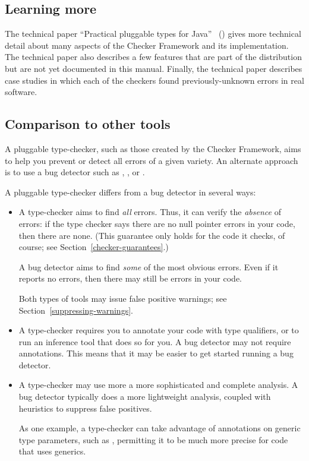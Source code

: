 \subsection{Learning more\label{learning-more}}

The technical paper ``Practical pluggable types for Java''~\cite{PapiACPE2008}
()
gives more technical detail about many
aspects of the Checker Framework and its implementation.
%
The technical paper also describes a few features that are part of the
distribution but are not yet documented in this manual.
%
Finally, the technical
paper describes case
studies in which each of the checkers found
previously-unknown errors in real software.


\subsection{Comparison to other tools\label{other-tools}}

A pluggable type-checker, such as those created by the Checker Framework,
aims to help you prevent or detect all errors of a given variety.  An
alternate approach is to use a bug detector such as
,
, or
.

A pluggable type-checker
differs from a bug detector in several ways:
\begin{itemize}
\item
  A type-checker aims to find \emph{all} errors.  Thus, it can verify the
  \emph{absence} of errors:  if the type checker says there are no null
  pointer errors in your code, then there are none.  (This guarantee only
  holds for the code it checks, of course; see
  Section~\ref{checker-guarantees}.)

  A bug detector aims to find \emph{some} of the most obvious errors.  Even
  if it reports no errors, then there may still be errors in your code.

  Both types of tools may issue false positive warnings; see
  Section~\ref{suppressing-warnings}.

\item
  A type-checker requires you to annotate your code with type qualifiers,
  or to run an inference tool that does so for you.  A bug detector may not
  require annotations.  This means that it may be easier to get started
  running a bug detector.

\item
  A type-checker may use more a more sophisticated and complete analysis.
  A bug detector typically does a more lightweight analysis, coupled with
  heuristics to suppress false positives.

  As one example, a type-checker can take advantage of annotations on
  generic type parameters, such as , permitting
  it to be much more precise for code that uses generics.

\end{itemize}

